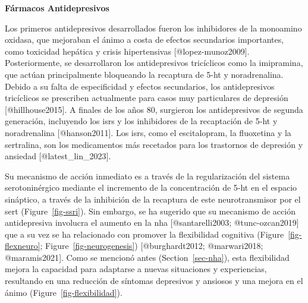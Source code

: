 \documentclass[
  11pt]{../MastersDoctoralThesisUNAM}
\begin{document}
\begin{tcolorbox}[enhanced jigsaw, colframe=quarto-callout-warning-color-frame, left=2mm, bottomrule=.15mm, rightrule=.15mm, arc=.35mm, toprule=.15mm, leftrule=.75mm, breakable, opacityback=0, colback=white]

\vspace{-3mm}\textbf{\textbf{Fármacos Antidepresivos}}\vspace{3mm}

Los primeros antidepresivos desarrollados fueron los inhibidores de la
monoamino oxidasa, que mejoraban el ánimo a costa de efectos secundarios
importantes, como toxicidad hepática y crisis hipertensivas
{[}@lopez-munoz2009{]}. Posteriormente, se desarrollaron los
antidepresivos tricíclicos como la imipramina, que actúan principalmente
bloqueando la recaptura de \ac{5-ht} y noradrenalina. Debido a su falta
de especificidad y efectos secundarios, los antidepresivos tricíclicos
se prescriben actualmente para casos muy particulares de depresión
{[}@hillhouse2015{]}. A finales de los años 80, surgieron los
antidepresivos de segunda generación, incluyendo los \ac{isrs} y los
inhibidores de la recaptación de \ac{5-ht} y noradrenalina
{[}@hanson2011{]}. Los \ac{isrs}, como el escitalopram, la fluoxetina y
la sertralina, son los medicamentos más recetados para los trastornos de
depresión y ansiedad {[}@latest\_lin\_2023{]}.

Su mecanismo de acción inmediato es a través de la regularización del
sistema serotoninérgico mediante el incremento de la concentración de
\ac{5-ht} en el espacio sináptico, a través de la inhibición de la
recaptura de este neurotransmisor por el \ac{sert}
(Figure~\ref{fig-ssri}). Sin embargo, se ha sugerido que su mecanismo de
acción antidepresiva involucra el aumento en la \ac{nha}
{[}@santarelli2003; @tunc-ozcan2019{]} que a su vez se ha relacionado
con promover la flexibilidad cognitiva (Figure~\ref{fig-flexneuro};
Figure~\ref{fig-neurogenesis}) {[}@burghardt2012; @marwari2018;
@maramis2021{]}. Como se mencionó antes (Section~\ref{sec-nha}), esta
flexibilidad mejora la capacidad para adaptarse a nuevas situaciones y
experiencias, resultando en una reducción de síntomas depresivos y
ansiosos y una mejora en el ánimo (Figure~\ref{fig-flexibilidad}).

\begin{figure}[H]

\centering{

}
\end{figure}
\end{tcolorbox}
\end{document}
